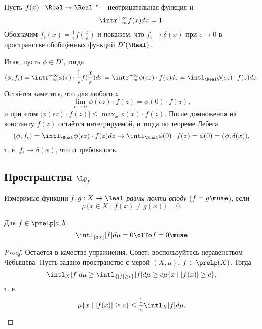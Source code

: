 \documentclass[main]{subfiles}
\begin{document}
\begin{example}
  Пусть \( f(x) : \Real \to \Real \) "---
  неотрицательная функция
  и
  \[
    \intr_{-\infty}^{+\infty} f(x) dx = 1.
  \]
  Обозначим
  \( f_\epsilon(x) = \frac1\epsilon f(\frac{x}{\epsilon}) \)
  и покажем, что
  \( f_\epsilon \to \delta(x) \) при \( \epsilon \to 0 \)
  в пространстве обобщённых функций \( D'(\Real) \).

  Итак, пусть \( \phi \in D' \),
  тогда
  \[
    (\phi, f_\epsilon) =
    \intr_{-\infty}^{+\infty} \phi(x) \cdot \frac1\epsilon
    f(\frac{x}{\epsilon}) dx =
    \intr_{-\infty}^{+\infty} \phi(\epsilon z) \cdot
    f(z) dz =
    \intl_{\Real} \phi(\epsilon z) \cdot
    f(z) dz.
  \]
  Остаётся заметить, что для любого \( z \)
  \[
    \lim_{\epsilon \to 0} \phi(\epsilon z) \cdot f(z) =
    \phi(0) \cdot f(z),
  \]
  и при этом \( |\phi(\epsilon z) \cdot f(z)| \le \max_x \phi(x) \cdot f(z) \).
  После домножения на константу \( f(z) \)
  остаётся интегрируемой, и тогда по теореме Лебега
  \[
    (\phi, f_\epsilon) =
    \intl_{\Real} \phi(\epsilon z) \cdot f(z) dz \to
    \intl_{\Real} \phi(0) \cdot f(z) = \phi(0) = (\phi, \delta(x)),
  \]
  т. е. \( f_\epsilon \to \delta(x) \), что и требовалось.
\end{example}

\subsection{Пространства \( \Lp_p \)}

\begin{definition}
  Измеримые функции \( f, g : X \to \Real \)
  \emph{равны почти всюду} (\( f = g \muae \)),
  если
  \[
    \mu \{ x \in X \mid f(x) \ne g(x) \} = 0.
  \]
\end{definition}

\begin{proposition}
  Для \( f \in \preLp[a, b] \)
  \[
    \intl_{[a,b]} |f| d \mu = 0 \oTTo
    f = 0 \muae
  \]
\end{proposition}
\begin{proof}
  Остаётся в качестве упражнения.
  Совет: воспользуйтесь неравенством Чебышёва.
  Пусть задано пространство с мерой \( (X, \mu) \),
  \( f \in \preLp(X) \). Тогда
  \[
    \intl_X |f| d \mu \ge
    \intl_{\{ |f| \ge c \}} |f| d \mu
    \ge c \mu \{ x \mid |f(x)| \ge c \},
  \]
  т. е.
  \[
    \mu\{ x \mid |f(x)| \ge c \}
    \le \frac1c \intl_X |f| d\mu.
  \]
\end{proof}
\end{document}
